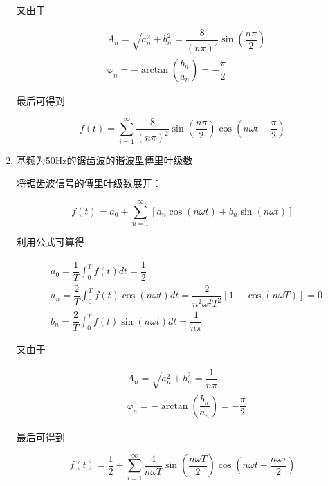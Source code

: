\documentclass[dvipsnames, svgnames,a4paper,11pt]{article}
\begin{document}
\begin{enumerate}
  又由于

  \begin{align*}
    & A_n = \sqrt{a_n^2 + b_n^2} = \dfrac{8}{(n\pi)^2}\sin (\dfrac{n\pi}{2})\\
    & \varphi_n = -\arctan (\dfrac{b_n}{a_n}) = -\dfrac{\pi}{2}
  \end{align*}
    
  最后可得到

  \begin{equation*}
    f(t) = \sum_{i = 1}^{\infty} \dfrac{8}{(n\pi)^2}\sin (\dfrac{n\pi}{2})\cos(n\omega t - \dfrac{\pi}{2}) 
  \end{equation*}


  \item 基频为50Hz的锯齿波的谐波型傅里叶级数

  将锯齿波信号的傅里叶级数展开：

  \begin{equation*}
    f(t) = a_0 + \sum_{n = 1}^{\infty} \left [ a_n \cos (n\omega t) + b_n \sin (n\omega t) \right ]
  \end{equation*}

  利用公式可算得

  \begin{align*}
    & a_0 = \dfrac{1}{T}\int_{0}^{T}f(t)dt = \dfrac{1}{2} \\
    & a_n = \dfrac{2}{T}\int_{0}^{T}f(t)\cos (n\omega t)dt = \dfrac{2}{n^2\omega^2 T^2} [1 - \cos(n\omega T)] = 0 \\
    & b_n = \dfrac{2}{T}\int_{0}^{T}f(t)\sin (n\omega t)dt = \dfrac{1}{n\pi}
  \end{align*}
    
  又由于

  \begin{align*}
    & A_n = \sqrt{a_n^2 + b_n^2} = \dfrac{1}{n\pi}\\
    & \varphi_n = -\arctan (\dfrac{b_n}{a_n}) = -\dfrac{\pi}{2}
  \end{align*}
    
  最后可得到

  \begin{equation*}
    f(t) = \dfrac{1}{2} + \sum_{i = 1}^{\infty} \dfrac{4}{n\omega T}\sin (\dfrac{n\omega T}{2}) \cos(n\omega t - \dfrac{n\omega \tau}{2})
  \end{equation*}



\end{enumerate}
\end{document}
